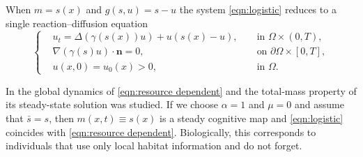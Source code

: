 \documentclass{article}
\begin{document}
    When $m=s(x)$ and $g(s,u)=s-u$ the system \eqref{eqn:logistic} reduces to a single reaction--diffusion equation \begin{equation}\label{eqn:resource dependent}
\left\{\begin{aligned}
    &u_t = \Delta(\gamma(s(x)) u) + u(s(x)-u),  && \text{ in }\Omega \times (0,T),\\
    &\nabla (\gamma(s)u) \cdot \textbf{n}=0, && \text{ on }\partial \Omega\times [0,T],\\
    &u(x,0) = u_0(x)>0, &&\text{ in } \Omega.
\end{aligned}\right.
\end{equation} 

In \cite{Tang2023} the global dynamics of \eqref{eqn:resource dependent} and the total-mass property of its steady-state solution was studied. If we choose $\alpha=1$ and $\mu=0$ and assume that $\bar s = s$, then $m(x,t)\equiv s(x)$ is a steady cognitive map and \eqref{eqn:logistic} coincides with \eqref{eqn:resource dependent}. Biologically, this corresponds to individuals that use only local habitat information and do not forget.
\end{document}
